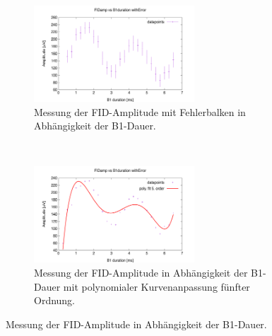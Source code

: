 \documentclass{article}
\begin{document}
    \begin{figure}
        \centering
        \begin{subfigure}[t]{0.45\textwidth}
            \centering
            \includegraphics[width=6cm]{../Bilddateien/B1DurationFast_FIDamp_vs_B1duration_withError.png}
            \caption{Messung der FID-Amplitude mit Fehlerbalken in Abhängigkeit der B1-Dauer.}
            \label{fig:5:FastFIDampVsB1durationWithError}
        \end{subfigure}
        \
        \begin{subfigure}[t]{0.45\textwidth}
            \centering
            \includegraphics[width=6cm]{../Bilddateien/B1DurationFast_FIDamp_vs_B1duration_withError_poly.png}
            \caption{Messung der FID-Amplitude in Abhängigkeit der B1-Dauer mit polynomialer Kurvenanpassung fünfter Ordnung.}
            \label{fig:5:FastFIDampVsB1duration}
        \end{subfigure}
        \caption{Messung der FID-Amplitude in Abhängigkeit der B1-Dauer.}
    \end{figure}
\end{document}
